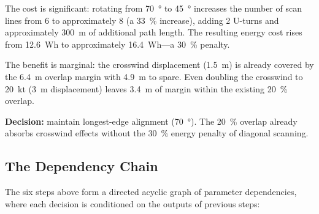 The cost is significant: rotating from \SI{70}{\degree} to \SI{45}{\degree} increases the number of scan lines from 6 to approximately 8 (a \SI{33}{\percent} increase), adding 2 U-turns and approximately \SI{300}{\metre} of additional path length.
The resulting energy cost rises from \SI{12.6}{Wh} to approximately \SI{16.4}{Wh}---a \SI{30}{\percent} penalty.

The benefit is marginal: the crosswind displacement (\SI{1.5}{\metre}) is already covered by the \SI{6.4}{\metre} overlap margin with \SI{4.9}{\metre} to spare.
Even doubling the crosswind to \SI{20}{kt} (\SI{3}{\metre} displacement) leaves \SI{3.4}{\metre} of margin within the existing \SI{20}{\percent} overlap.

\textbf{Decision:} maintain longest-edge alignment (\SI{70}{\degree}).
The \SI{20}{\percent} overlap already absorbs crosswind effects without the \SI{30}{\percent} energy penalty of diagonal scanning.

\subsection{The Dependency Chain}\label{sec:dependency-chain}

The six steps above form a directed acyclic graph of parameter dependencies, where each decision is conditioned on the outputs of previous steps:

